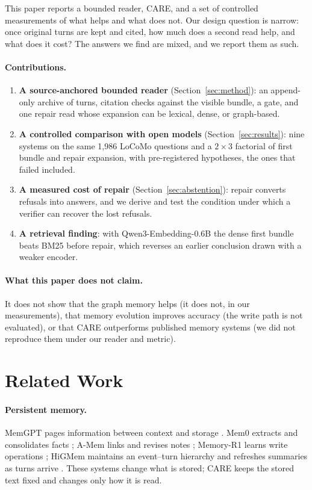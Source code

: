 \documentclass[10pt]{article}
\theoremstyle{plain}
\newcommand{\care}{\textsc{CARE}}
\begin{document}
This paper reports a bounded reader, \care{}, and a set of controlled measurements of what helps and what
does not. Our design question is narrow: once original turns are kept and cited, how much does a second
read help, and what does it cost? The answers we find are mixed, and we report them as such.

\paragraph{Contributions.}
\begin{enumerate}
  \item \textbf{A source-anchored bounded reader} (Section~\ref{sec:method}): an append-only archive of
  turns, citation checks against the visible bundle, a gate, and one repair read whose expansion can be
  lexical, dense, or graph-based.
  \item \textbf{A controlled comparison with open models} (Section~\ref{sec:results}): nine systems on the
  same 1,986 LoCoMo questions and a $2\times3$ factorial of first bundle and repair expansion, with
  pre-registered hypotheses, the ones that failed included.
  \item \textbf{A measured cost of repair} (Section~\ref{sec:abstention}): repair converts refusals into
  answers, and we derive and test the condition under which a verifier can recover the lost refusals.
  \item \textbf{A retrieval finding}: with Qwen3-Embedding-0.6B the dense first bundle beats BM25 before
  repair, which reverses an earlier conclusion drawn with a weaker encoder.
\end{enumerate}

\paragraph{What this paper does not claim.} It does not show that the graph memory helps (it does not, in
our measurements), that memory evolution improves accuracy (the write path is not evaluated), or that
\care{} outperforms published memory systems (we did not reproduce them under our reader and metric).

\section{Related Work}
\label{sec:related}

\paragraph{Persistent memory.} MemGPT pages information between context and storage \citep{packer2023memgpt}.
Mem0 extracts and consolidates facts \citep{chhikara2025mem0}; A-Mem links and revises notes \citep{amem2025};
Memory-R1 learns write operations \citep{memoryr12025}; HiGMem maintains an event--turn hierarchy and refreshes
summaries as turns arrive \citep{cao2026higmem}. These systems change what is stored; \care{} keeps the stored
text fixed and changes only how it is read.
\end{document}
